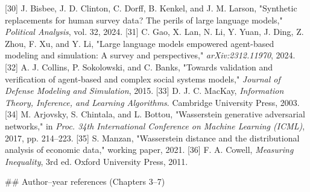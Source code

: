 [30] J. Bisbee, J. D. Clinton, C. Dorff, B. Kenkel, and J. M. Larson, "Synthetic replacements for human survey data? The perils of large language models," \textit{Political Analysis}, vol. 32, 2024.
[31] C. Gao, X. Lan, N. Li, Y. Yuan, J. Ding, Z. Zhou, F. Xu, and Y. Li, "Large language models empowered agent-based modeling and simulation: A survey and perspectives," \textit{arXiv:2312.11970}, 2024.
[32] A. J. Collins, P. Sokolowski, and C. Banks, "Towards validation and verification of agent-based and complex social systems models," \textit{Journal of Defense Modeling and Simulation}, 2015.
[33] D. J. C. MacKay, \textit{Information Theory, Inference, and Learning Algorithms}. Cambridge University Press, 2003.
[34] M. Arjovsky, S. Chintala, and L. Bottou, "Wasserstein generative adversarial networks," in \textit{Proc. 34th International Conference on Machine Learning (ICML)}, 2017, pp. 214–223.
[35] S. Manzan, "Wasserstein distance and the distributional analysis of economic data," working paper, 2021.
[36] F. A. Cowell, \textit{Measuring Inequality}, 3rd ed. Oxford University Press, 2011.

\#\# Author–year references (Chapters 3–7)

